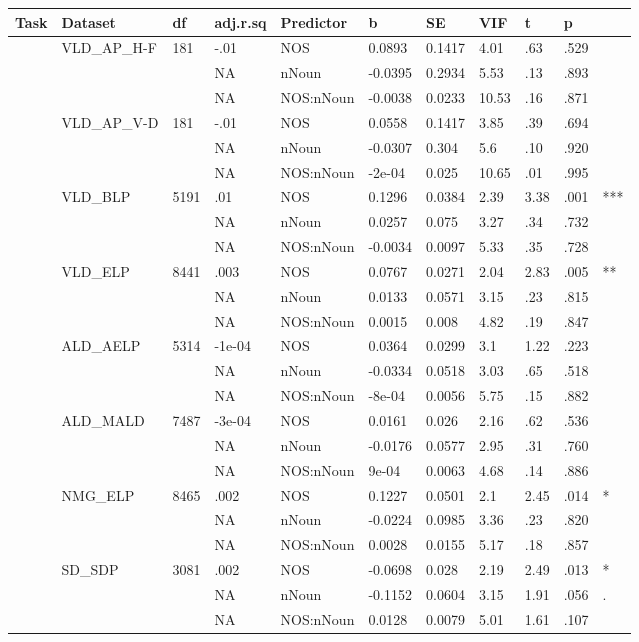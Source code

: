 \begin{table}[ht]
\centering
\begingroup\normalsize
\begin{tabular}{lllllllllll}
  \hline
Task & Dataset & df & adj.r.sq & Predictor & b & SE & VIF & t & p &  \\ 
  \hline
 & VLD\_AP\_H-F & 181 & -.01 & NOS & 0.0893 & 0.1417 & 4.01 & .63 & .529 &   \\ 
   &  &  & NA & nNoun & -0.0395 & 0.2934 & 5.53 & .13 & .893 &   \\ 
   &  &  & NA & NOS:nNoun & -0.0038 & 0.0233 & 10.53 & .16 & .871 &   \\ 
   & VLD\_AP\_V-D & 181 & -.01 & NOS & 0.0558 & 0.1417 & 3.85 & .39 & .694 &   \\ 
   &  &  & NA & nNoun & -0.0307 & 0.304 & 5.6 & .10 & .920 &   \\ 
   &  &  & NA & NOS:nNoun & -2e-04 & 0.025 & 10.65 & .01 & .995 &   \\ 
   & VLD\_BLP & 5191 & .01 & NOS & 0.1296 & 0.0384 & 2.39 & 3.38 & .001 & *** \\ 
   &  &  & NA & nNoun & 0.0257 & 0.075 & 3.27 & .34 & .732 &   \\ 
   &  &  & NA & NOS:nNoun & -0.0034 & 0.0097 & 5.33 & .35 & .728 &   \\ 
   & VLD\_ELP & 8441 & .003 & NOS & 0.0767 & 0.0271 & 2.04 & 2.83 & .005 & ** \\ 
   &  &  & NA & nNoun & 0.0133 & 0.0571 & 3.15 & .23 & .815 &   \\ 
   &  &  & NA & NOS:nNoun & 0.0015 & 0.008 & 4.82 & .19 & .847 &   \\ 
   & ALD\_AELP & 5314 & -1e-04 & NOS & 0.0364 & 0.0299 & 3.1 & 1.22 & .223 &   \\ 
   &  &  & NA & nNoun & -0.0334 & 0.0518 & 3.03 & .65 & .518 &   \\ 
   &  &  & NA & NOS:nNoun & -8e-04 & 0.0056 & 5.75 & .15 & .882 &   \\ 
   & ALD\_MALD & 7487 & -3e-04 & NOS & 0.0161 & 0.026 & 2.16 & .62 & .536 &   \\ 
   &  &  & NA & nNoun & -0.0176 & 0.0577 & 2.95 & .31 & .760 &   \\ 
   &  &  & NA & NOS:nNoun & 9e-04 & 0.0063 & 4.68 & .14 & .886 &   \\ 
   & NMG\_ELP & 8465 & .002 & NOS & 0.1227 & 0.0501 & 2.1 & 2.45 & .014 & * \\ 
   &  &  & NA & nNoun & -0.0224 & 0.0985 & 3.36 & .23 & .820 &   \\ 
   &  &  & NA & NOS:nNoun & 0.0028 & 0.0155 & 5.17 & .18 & .857 &   \\ 
   & SD\_SDP & 3081 & .002 & NOS & -0.0698 & 0.028 & 2.19 & 2.49 & .013 & * \\ 
   &  &  & NA & nNoun & -0.1152 & 0.0604 & 3.15 & 1.91 & .056 & . \\ 
   &  &  & NA & NOS:nNoun & 0.0128 & 0.0079 & 5.01 & 1.61 & .107 &   \\ 
   \hline
\end{tabular}
\endgroup
\end{table}
